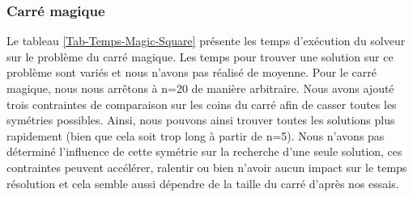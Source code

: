 \FloatBarrier

\subsubsection{Carré magique}
Le tableau \ref{Tab-Temps-Magic-Square} présente les temps d'exécution du solveur sur le problème du carré magique. Les temps pour trouver une solution sur ce problème sont variés et nous n'avons pas réalisé de moyenne. Pour le carré magique, nous nous arrêtons à n=20 de manière arbitraire. Nous avons ajouté trois contraintes de comparaison sur les coins du carré afin de casser toutes les symétries possibles. Ainsi, nous pouvons ainsi trouver toutes les solutions plus rapidement (bien que cela soit trop long à partir de n=5). Nous n'avons pas déterminé l'influence de cette symétrie sur la recherche d'une seule solution, ces contraintes peuvent accélérer, ralentir ou bien n'avoir aucun impact sur le temps résolution et cela semble aussi dépendre de la taille du carré d'après nos essais.

